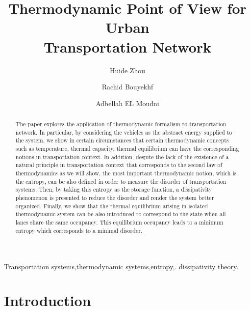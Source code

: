 \documentclass[preprint,authoryear,12pt]{elsarticle}
\begin{document}
\begin{frontmatter}

\title{Thermodynamic Point of View for Urban\\ Transportation Network}
\author[SeT]{Huide Zhou}
\author[SeT]{Rachid Bouyekhf}
\author[SeT]{Adbellah EL Moudni}
\address[SeT]{Laboratoire Syst\`{e}mes et Transports (SeT),\\
Universit\'{e} de Technologie de Belfort-Montb\'{e}liard (UTBM)\\
Rue Thierry Mieg, 90010 Belfort Cedex, France}

\begin{abstract}
The paper  explores the application of thermodynamic  formalism to transportation
network. In particular, by considering
the vehicles as the abstract energy supplied to the system, we show  in
certain circumstances that  certain thermodynamic
concepts such as  temperature, thermal capacity, thermal
equilibrium can have the corresponding notions in transportation
context. In addition, despite the lack  of the existence  of a natural principle in transportation context that corresponds to the second law of thermodynamics as we will show,  the most important
thermodynamic notion, which is the entropy, can be also defined in
order to measure the disorder of transportation systems. Then, by
taking this entropy as the storage function, a dissipativity
phenomenon is presented to reduce the disorder and render the system
better organized.
Finally, we show that the thermal equilibrium arising in isolated
thermodynamic system can be also introduced to correspond to
the state when all lanes share the same occupancy. This equilibrium
occupancy leads  to a minimum entropy which corresponds to a minimal disorder.
\end{abstract}

\begin{keyword}
Transportation systems\sep thermodynamic systems\sep  entropy\sep.
dissipativity theory.
\end{keyword}

\end{frontmatter}

\section{Introduction}
\end{document}
